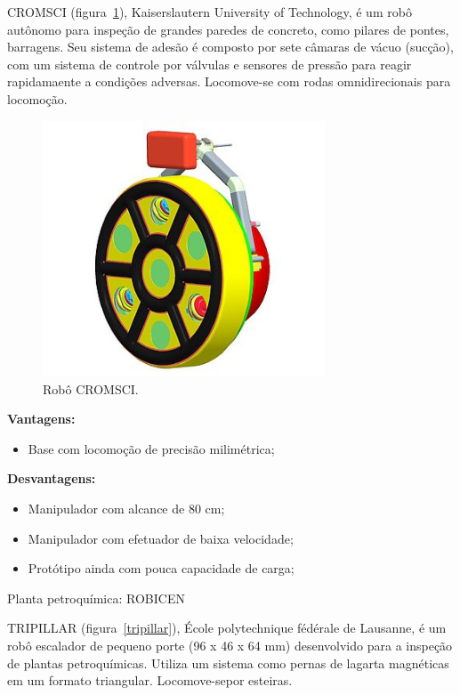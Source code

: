 CROMSCI (figura~\ref{cromsci}), Kaiserslautern University of Technology, é um
robô autônomo para inspeção de grandes paredes de concreto, como pilares de pontes, barragens. Seu
sistema de adesão é composto por sete câmaras de vácuo (sucção), com um sistema
de controle por válvulas e sensores de pressão para reagir rapidamaente a
condições adversas. Locomove-se com rodas omnidirecionais para locomoção.

\begin{figure}[ht]
\centering
\includegraphics[width=8.4cm]{figs/climbers/cromsci.jpg}
\caption{Robô CROMSCI.}
\label{cromsci}
\end{figure}

\textbf{Vantagens:}
\begin{itemize}
  \item Base com locomoção de precisão milimétrica; 
\end{itemize}

\textbf{Desvantagens:}
\begin{itemize}
  \item Manipulador com alcance de 80 cm;
  \item Manipulador com efetuador de baixa velocidade;
  \item Protótipo ainda com pouca capacidade de carga;
\end{itemize}

Planta petroquímica: ROBICEN

TRIPILLAR (figura~\ref{tripillar}), École polytechnique fédérale de Lausanne, é
um robô escalador de pequeno porte (96 x 46 x 64 mm) desenvolvido para a inspeção de plantas
petroquímicas. Utiliza um sistema como pernas de lagarta magnéticas em um
formato triangular. Locomove-sepor esteiras.

